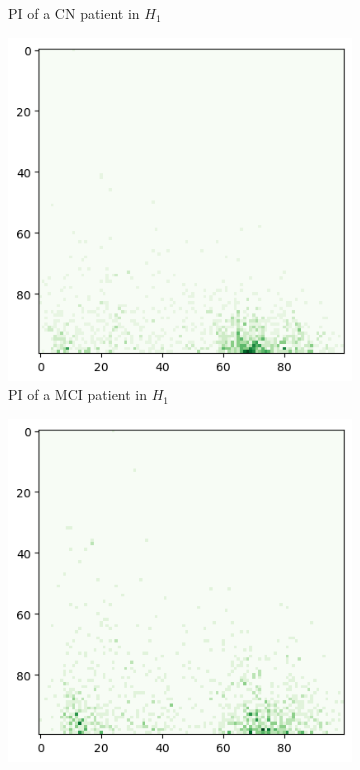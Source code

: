\documentclass{article}
\begin{document}
\begin{figure}
\begin{subfigure}{0.32\textwidth}
    \caption{PI of a CN patient in $H_1$}
  \end{subfigure}
  \begin{subfigure}{0.32\textwidth}
    \includegraphics[width=\textwidth]{figures/PIs/Persistence_image_MCI_h_1.png}
    \caption{PI of a MCI patient in $H_1$}
  \end{subfigure}
  \begin{subfigure}{0.32\textwidth}
    \includegraphics[width=\textwidth]{figures/PIs/Persistence_image_AD_h_1.png}

\end{subfigure}
\end{figure}
\end{document}
